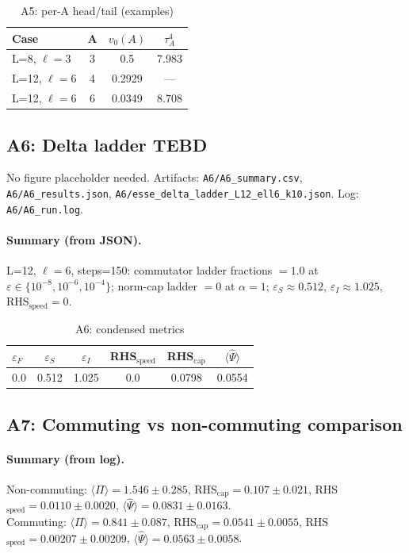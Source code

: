 \documentclass[10pt]{article}
\begin{document}
\begin{table}[!ht]
\centering
\caption{A5: per-A head/tail (examples)}
\label{tab:a5-perA}
\begin{tabular}{@{}lccc@{}}
\toprule
Case & A & $v_0(A)$ & $\tau_A^4$ \\
\midrule
L=8, \(\ell{=}3\) & 3 & 0.5 & 7.983 \\
L=12, \(\ell{=}6\) & 4 & 0.2929 & — \\
L=12, \(\ell{=}6\) & 6 & 0.0349 & 8.708 \\
\bottomrule
\end{tabular}
\end{table}

\subsection{A6: Delta ladder TEBD}\label{app:a6}
No figure placeholder needed. Artifacts: \texttt{A6/A6\_summary.csv}, \texttt{A6/A6\_results.json}, \texttt{A6/esse\_delta\_ladder\_L12\_ell6\_k10.json}. Log: \texttt{A6/A6\_run.log}.

\paragraph{Summary (from JSON).}
L=12, \(\ell{=}6\), steps=150: commutator ladder fractions $=1.0$ at $\varepsilon\in\{10^{-8},10^{-6},10^{-4}\}$; norm-cap ladder $=0$ at $\alpha{=}1$; $\varepsilon_S\approx0.512$, $\varepsilon_I\approx1.025$, RHS$_{\mathrm{speed}}{=}0$.

\begin{table}[!ht]
\centering
\caption{A6: condensed metrics}
\label{tab:a6-condensed}
\begin{tabular}{@{}lccccc@{}}
\toprule
$\varepsilon_F$ & $\varepsilon_S$ & $\varepsilon_I$ & RHS$_{\mathrm{speed}}$ & RHS$_{\mathrm{cap}}$ & $\langle\widehat{\Psi}\rangle$ \\
\midrule
0.0 & 0.512 & 1.025 & 0.0 & 0.0798 & 0.0554 \\
\bottomrule
\end{tabular}
\end{table}

\subsection{A7: Commuting vs non-commuting comparison}\label{app:a7}


\paragraph{Summary (from log).}
Non-commuting: $\langle\Pi\rangle=1.546\pm0.285$, RHS$_{\mathrm{cap}}=0.107\pm0.021$, RHS$_{\mathrm{speed}}=0.0110\pm0.0020$, $\langle\widehat{\Psi}\rangle=0.0831\pm0.0163$.\\
Commuting: $\langle\Pi\rangle=0.841\pm0.087$, RHS$_{\mathrm{cap}}=0.0541\pm0.0055$, RHS$_{\mathrm{speed}}=0.00207\pm0.00209$, $\langle\widehat{\Psi}\rangle=0.0563\pm0.0058$.
\end{document}
